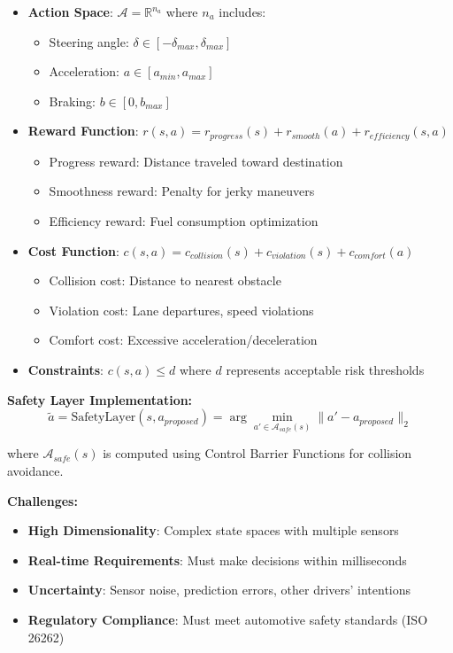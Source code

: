 \documentclass[12pt]{article}
\begin{document}
{{{{\begin{itemize}
\item \textbf{Action Space}: $\mathcal{A} = \mathbb{R}^{n_a}$ where $n_a$ includes:
\begin{itemize}
\item Steering angle: $\delta \in [-\delta_{max}, \delta_{max}]$
\item Acceleration: $a \in [a_{min}, a_{max}]$
\item Braking: $b \in [0, b_{max}]$
\end{itemize}

\item \textbf{Reward Function}: $r(s,a) = r_{progress}(s) + r_{smooth}(a) + r_{efficiency}(s,a)$
\begin{itemize}
\item Progress reward: Distance traveled toward destination
\item Smoothness reward: Penalty for jerky maneuvers
\item Efficiency reward: Fuel consumption optimization
\end{itemize}

\item \textbf{Cost Function}: $c(s,a) = c_{collision}(s) + c_{violation}(s) + c_{comfort}(a)$
\begin{itemize}
\item Collision cost: Distance to nearest obstacle
\item Violation cost: Lane departures, speed violations
\item Comfort cost: Excessive acceleration/deceleration
\end{itemize}

\item \textbf{Constraints}: $c(s,a) \leq d$ where $d$ represents acceptable risk thresholds
\end{itemize}

\textbf{Safety Layer Implementation:}
\begin{equation}
\tilde{a} = \text{SafetyLayer}(s, a_{proposed}) = \arg\min_{a' \in \mathcal{A}_{safe}(s)} \|a' - a_{proposed}\|_2
\end{equation}

where $\mathcal{A}_{safe}(s)$ is computed using Control Barrier Functions for collision avoidance.

\textbf{Challenges:}
\begin{itemize}
\item \textbf{High Dimensionality}: Complex state spaces with multiple sensors
\item \textbf{Real-time Requirements}: Must make decisions within milliseconds
\item \textbf{Uncertainty}: Sensor noise, prediction errors, other drivers' intentions
\item \textbf{Regulatory Compliance}: Must meet automotive safety standards (ISO 26262)
\end{itemize}

}}}}
\end{document}
